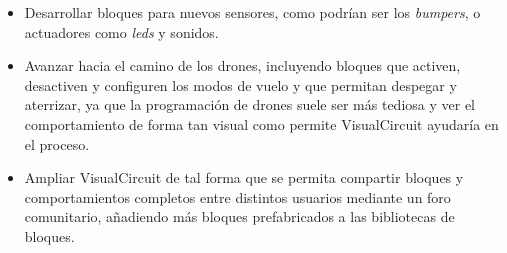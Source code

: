 \begin{itemize}
	\item   Desarrollar bloques para nuevos sensores, como podrían ser los \textit{bumpers}, o actuadores como \textit{leds} y sonidos.
	\item   Avanzar hacia el camino de los drones, incluyendo bloques que activen, desactiven y configuren los modos de vuelo y que
                permitan despegar y aterrizar, ya que la programación de drones suele ser más tediosa y ver el comportamiento
                de forma tan visual como permite VisualCircuit ayudaría en el proceso.
	\item   Ampliar VisualCircuit de tal forma que se permita compartir bloques y comportamientos completos entre distintos usuarios
                mediante un foro comunitario, añadiendo más bloques prefabricados a las bibliotecas de bloques.
\end{itemize}
